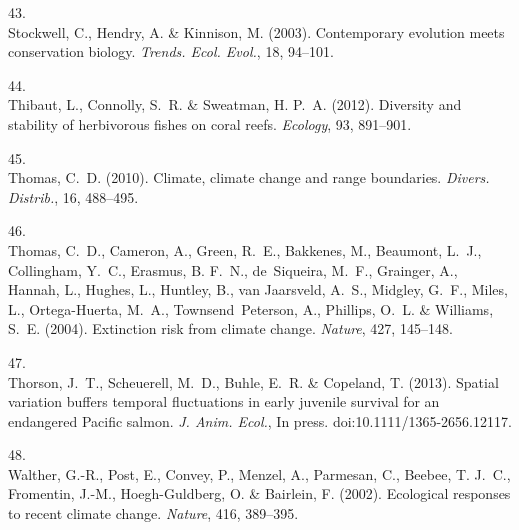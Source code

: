 \documentclass[11pt]{article}
\begin{document}
\begin{spacing}{1.6}
\begin{thebibliography}{50}
43.\\
Stockwell, C., Hendry, A. \& Kinnison, M. (2003).
\newblock Contemporary evolution meets conservation biology.
\newblock \emph{Trends. Ecol. Evol.}, 18, 94--101.

44.\\
Thibaut, L., Connolly, S.~R. \& Sweatman, H. P.~A. (2012).
\newblock Diversity and stability of herbivorous fishes on coral reefs.
\newblock \emph{Ecology}, 93, 891--901.

45.\\
Thomas, C.~D. (2010).
\newblock Climate, climate change and range boundaries.
\newblock \emph{Divers. Distrib.}, 16, 488--495.

46.\\
Thomas, C.~D., Cameron, A., Green, R.~E., Bakkenes, M., Beaumont, L.~J.,
  Collingham, Y.~C., Erasmus, B. F.~N., de~Siqueira, M.~F., Grainger, A.,
  Hannah, L., Hughes, L., Huntley, B., van Jaarsveld, A.~S., Midgley, G.~F.,
  Miles, L., Ortega-Huerta, M.~A., Townsend~Peterson, A., Phillips, O.~L. \&
  Williams, S.~E. (2004).
\newblock Extinction risk from climate change.
\newblock \emph{Nature}, 427, 145--148.

47.\\
Thorson, J.~T., Scheuerell, M.~D., Buhle, E.~R. \& Copeland, T. (2013).
\newblock Spatial variation buffers temporal fluctuations in early juvenile
  survival for an endangered {Pacific} salmon.
\newblock \emph{J. Anim. Ecol.}, In press. doi:10.1111/1365-2656.12117.

48.\\
Walther, G.-R., Post, E., Convey, P., Menzel, A., Parmesan, C., Beebee, T.
  J.~C., Fromentin, J.-M., Hoegh-Guldberg, O. \& Bairlein, F. (2002).
\newblock Ecological responses to recent climate change.
\newblock \emph{Nature}, 416, 389--395.


\end{thebibliography}
\end{spacing}
\end{document}
